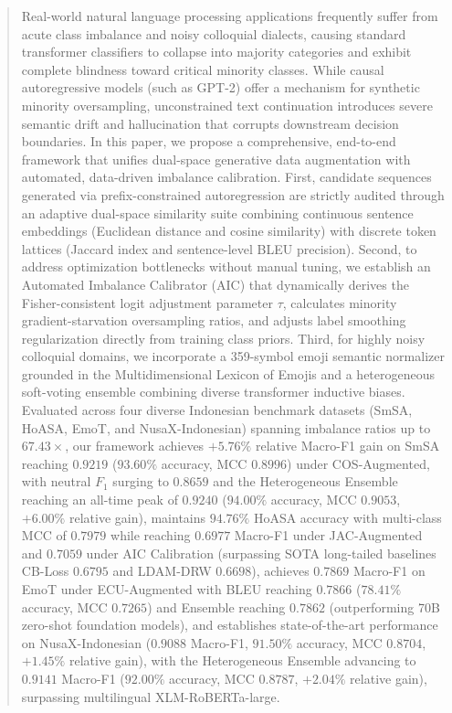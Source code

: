 \documentclass{ieeeaccess}
\begin{document}
\begin{abstract}
Real-world natural language processing applications frequently suffer from acute class imbalance and noisy colloquial dialects, causing standard transformer classifiers to collapse into majority categories and exhibit complete blindness toward critical minority classes. While causal autoregressive models (such as GPT-2) offer a mechanism for synthetic minority oversampling, unconstrained text continuation introduces severe semantic drift and hallucination that corrupts downstream decision boundaries. In this paper, we propose a comprehensive, end-to-end framework that unifies dual-space generative data augmentation with automated, data-driven imbalance calibration. First, candidate sequences generated via prefix-constrained autoregression are strictly audited through an adaptive dual-space similarity suite combining continuous sentence embeddings (Euclidean distance and cosine similarity) with discrete token lattices (Jaccard index and sentence-level BLEU precision). Second, to address optimization bottlenecks without manual tuning, we establish an Automated Imbalance Calibrator (AIC) that dynamically derives the Fisher-consistent logit adjustment parameter $\tau$, calculates minority gradient-starvation oversampling ratios, and adjusts label smoothing regularization directly from training class priors. Third, for highly noisy colloquial domains, we incorporate a 359-symbol emoji semantic normalizer grounded in the Multidimensional Lexicon of Emojis and a heterogeneous soft-voting ensemble combining diverse transformer inductive biases. Evaluated across four diverse Indonesian benchmark datasets (SmSA, HoASA, EmoT, and NusaX-Indonesian) spanning imbalance ratios up to $67.43\times$, our framework achieves $+5.76\%$ relative Macro-F1 gain on SmSA reaching $0.9219$ ($93.60\%$ accuracy, MCC $0.8996$) under COS-Augmented, with neutral $F_1$ surging to $0.8659$ and the Heterogeneous Ensemble reaching an all-time peak of $0.9240$ ($94.00\%$ accuracy, MCC $0.9053$, $+6.00\%$ relative gain), maintains $94.76\%$ HoASA accuracy with multi-class MCC of $0.7979$ while reaching $0.6977$ Macro-F1 under JAC-Augmented and $0.7059$ under AIC Calibration (surpassing SOTA long-tailed baselines CB-Loss $0.6795$ and LDAM-DRW $0.6698$), achieves $0.7869$ Macro-F1 on EmoT under ECU-Augmented with BLEU reaching $0.7866$ ($78.41\%$ accuracy, MCC $0.7265$) and Ensemble reaching $0.7862$ (outperforming 70B zero-shot foundation models), and establishes state-of-the-art performance on NusaX-Indonesian ($0.9088$ Macro-F1, $91.50\%$ accuracy, MCC $0.8704$, $+1.45\%$ relative gain), with the Heterogeneous Ensemble advancing to $0.9141$ Macro-F1 ($92.00\%$ accuracy, MCC $0.8787$, $+2.04\%$ relative gain), surpassing multilingual XLM-RoBERTa-large.
\end{abstract}
\end{document}
